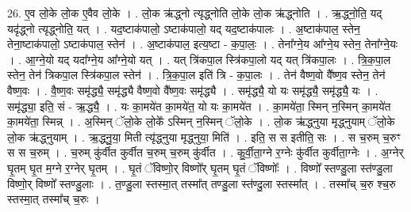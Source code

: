 \documentclass[17pt]{extarticle}
\begin{document}
26. ए॒व लो॒के लो॒क ए॒वैव लो॒के । . लो॒क ऋ॑द्ध्नो त्यृद्ध्नोति लो॒के लो॒क ऋ॑द्ध्नोति । . ऋ॒द्ध्नो॒ति॒ यद् यदृ॑द्ध्नो त्यृद्ध्नोति॒ यत् । . यद॒ष्टाक॑पालो॒ ऽष्टाक॑पालो॒ यद् यद॒ष्टाक॑पालः । . अ॒ष्टाक॑पाल॒ स्तेन॒ तेना॒ष्टाक॑पालो॒ ऽष्टाक॑पाल॒ स्तेन॑ । . अ॒ष्टाक॑पाल॒ इत्य॒ष्टा - क॒पा॒लः॒ । . तेना᳚ग्ने॒य आ᳚ग्ने॒य स्तेन॒ तेना᳚ग्ने॒यः । . आ॒ग्ने॒यो यद् यदा᳚ग्ने॒य आ᳚ग्ने॒यो यत् । . यत् त्रि॑कपा॒ल स्त्रि॑कपा॒लो यद् यत् त्रि॑कपा॒लः । . त्रि॒क॒पा॒ल स्तेन॒ तेन॑ त्रिकपा॒ल स्त्रि॑कपा॒ल स्तेन॑ । . त्रि॒क॒पा॒ल इति॑ त्रि - क॒पा॒लः । . तेन॑ वैष्ण॒वो वै᳚ष्ण॒व स्तेन॒ तेन॑ वैष्ण॒वः । . वै॒ष्ण॒वः समृ॑द्ध्यै॒ समृ॑द्ध्यै वैष्ण॒वो वै᳚ष्ण॒वः समृ॑द्ध्यै । . समृ॑द्ध्यै॒ यो यः समृ॑द्ध्यै॒ समृ॑द्ध्यै॒ यः । . समृ॑द्ध्या॒ इति॒ सं - ऋ॒द्ध्यै॒ । . यः का॒मये॑त का॒मये॑त॒ यो यः का॒मये॑त । . का॒मये॑ता॒ स्मिन् न॒स्मिन् का॒मये॑त का॒मये॑ता॒ स्मिन्न् । . अ॒स्मिन् ॅलो॒के लो॒के᳚ ऽस्मिन् न॒स्मिन् ॅलो॒के । . लो॒क ऋ॑द्ध्नुया मृद्ध्नुयाम् ॅलो॒के लो॒क ऋ॑द्ध्नुयाम् । . ऋ॒द्ध्नु॒या॒ मिती त्यृ॑द्ध्नुया मृद्ध्नुया॒ मिति॑ । . इति॒ स स इतीति॒ सः । . स च॒रुम् च॒रुꣳ स स च॒रुम् । . च॒रुम् कु॑र्वीत कुर्वीत च॒रुम् च॒रुम् कु॑र्वीत । . कु॒र्वी॒ता॒ग्ने र॒ग्नेः कु॑र्वीत कुर्वीता॒ग्नेः । . अ॒ग्नेर् घृ॒तम् घृ॒त म॒ग्ने र॒ग्नेर् घृ॒तम् । . घृ॒तं ॅविष्णो॒र् विष्णो᳚र् घृ॒तम् घृ॒तं ॅविष्णोः᳚ । . विष्णो᳚ स्तण्डु॒ला स्त॑ण्डु॒ला विष्णो॒र् विष्णो᳚ स्तण्डु॒लाः । . त॒ण्डु॒ला स्तस्मा॒त् तस्मा᳚त् तण्डु॒ला स्त॑ण्दु॒ला स्तस्मा᳚त् । . तस्मा᳚च् च॒रु श्च॒रु स्तस्मा॒त् तस्मा᳚च् च॒रुः । \newline
\end{document}
